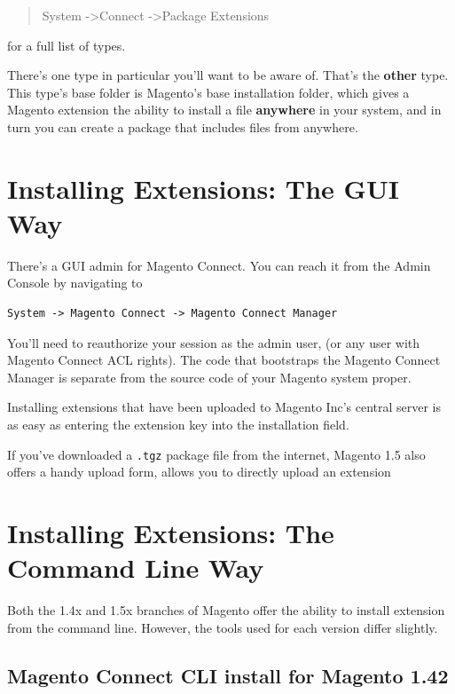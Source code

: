 \documentclass[oneside]{book}
\begin{document}
\begin{quote}
System -\textgreater  Connect -\textgreater  Package Extensions
\end{quote}

for a full list of types.

There's one type in particular you'll want to be aware of.  That's the \textbf{other} type.  This type's base folder is Magento's base installation folder, which gives a Magento extension the ability to install a file \textbf{anywhere} in your system, and in turn you can create a package that includes files from anywhere.

\section{Installing Extensions: The GUI Way}

There's a GUI admin for Magento Connect.  You can reach it from the Admin Console by navigating to

\begin{lstlisting}
System -> Magento Connect -> Magento Connect Manager

\end{lstlisting}


You'll need to reauthorize your session as the admin user, (or any user with Magento Connect ACL rights).  The code that bootstraps the Magento Connect Manager is separate from the source code of your Magento system proper.

Installing extensions that have been uploaded to Magento Inc's central server is as easy as entering the extension key into the installation field.

If you've downloaded a \footnotesize\texttt{.tgz} \normalsize  package file from the internet, Magento 1.5 also offers a handy upload form, allows you to directly upload an extension

\section{Installing Extensions: The Command Line Way}

Both the 1.4x and 1.5x branches of Magento offer the ability to install extension from the command line.  However, the tools used for each version differ slightly.

\subsection{Magento Connect CLI install for Magento 1.42}
\end{document}
